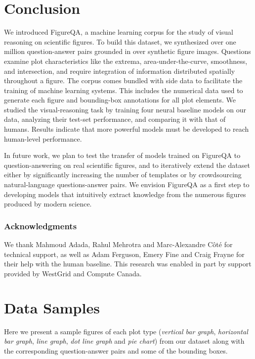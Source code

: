 \documentclass{article} \usepackage{iclr2018_workshop,times}
\begin{document}
\FloatBarrier

\section{Conclusion}
We introduced FigureQA, a machine learning corpus for the study of visual reasoning on scientific figures.
To build this dataset, we synthesized over one million question-answer pairs grounded in over  synthetic figure images.
Questions examine plot characteristics like the extrema, area-under-the-curve, smoothness, and intersection, and require integration of information distributed spatially throughout a figure.
The corpus comes bundled with side data to facilitate the training of machine learning systems.
This includes the numerical data used to generate each figure and bounding-box annotations for all plot elements.
We studied the visual-reasoning task by training four neural baseline models on our data, analyzing their test-set performance, and comparing it with that of humans.
Results indicate that more powerful models must be developed to reach human-level performance.

In future work, we plan to test the transfer of models trained on FigureQA to question-answering on real scientific figures, and to iteratively extend the dataset either by significantly increasing the number of templates or by crowdsourcing natural-language questions-answer pairs.
We envision FigureQA as a first step to developing models that intuitively extract knowledge from the numerous figures produced by modern science.




\subsubsection*{Acknowledgments}
We thank Mahmoud Adada, Rahul Mehrotra and Marc-Alexandre Côté for technical support, as well as Adam Ferguson, Emery Fine and Craig Frayne for their help with the human baseline. This research was enabled in part by support provided by WestGrid and Compute Canada.




\newpage
\appendix
\section{Data Samples}
\label{sec:samples}
Here we present a sample figures of each plot type (\emph{vertical bar graph}, \emph{horizontal bar graph}, \emph{line graph}, \emph{dot line graph} and \emph{pie chart}) from our dataset along with the corresponding question-answer pairs and some of the bounding boxes.
\end{document}
